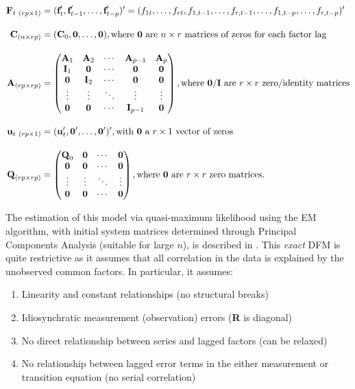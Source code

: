 \documentclass[a4paper]{article}
\begin{document}
\begin{align} \vspace{-4cm}
\textbf{F}_{t\ (rp \times 1)}  &= (\textbf{f}_t', \textbf{f}_{t-1}', \dots, \textbf{f}_{t-p}')' = (f_{1t}, \dots, f_{rt}, f_{1,t-1}, \dots, f_{r,t-1}, \dots, f_{1,t-p}, \dots, f_{r,t-p})' \\[1em]
\textbf{C}_{(n \times rp)}  &= (\textbf{C}_0, \textbf{0}, \dots, \textbf{0}), \text{where \textbf{0} are $n\times r$ matrices of zeros for each factor lag} \\[1em]
\textbf{A}_{(rp \times rp)}  &= \begin{pmatrix}
\textbf{A}_1 & \textbf{A}_2 & \cdots & \textbf{A}_{p-1}  & \textbf{A}_p \\
\textbf{I}_1 & \textbf{0} & \cdots & \textbf{0} & \textbf{0} \\
\textbf{0} & \textbf{I}_2 & \cdots & \textbf{0} & \textbf{0} \\ 
\vdots & \vdots & \ddots & \vdots & \vdots \\
\textbf{0} & \textbf{0} & \cdots & \textbf{I}_{p-1} & \textbf{0}
\end{pmatrix}, \text{where \textbf{0}/\textbf{I} are $r\times r$ zero/identity matrices} \\[1em]
\textbf{u}_{t\ (rp \times 1)}  &= (\textbf{u}_t', \textbf{0}', \dots, \textbf{0}')', \text{with \textbf{0} a $r \times 1$ vector of zeros}  \\[1em]
\textbf{Q}_{(rp \times rp)}  &= \begin{pmatrix}
\textbf{Q}_0 & \textbf{0} & \cdots & \textbf{0} \\
\textbf{0} & \textbf{0}& \cdots & \textbf{0} \\ 
\vdots & \vdots & \ddots & \vdots  \\
\textbf{0} & \textbf{0} & \cdots & \textbf{0}
\end{pmatrix}, \text{where \textbf{0} are $r\times r$ zero matrices.} 
\end{align}

The estimation of this model via quasi-maximum likelihood using the EM algorithm, with initial system matrices determined through Principal Components Analysis (suitable for large $n$), is described in \citet{doz2012quasi}. This \emph{exact} DFM is quite restrictive as it assumes that all correlation in the data is explained by the unobserved common factors. In particular, it assumes:

\begin{enumerate}
\item Linearity and constant relationships (no structural breaks)
\item Idiosynchratic measurement (observation) errors (\textbf{R} is diagonal)
\item No direct relationship between series and lagged factors (can be relaxed)
\item No relationship between lagged error terms in the either measurement or transition equation (no serial correlation)
\end{enumerate}
\end{document}
